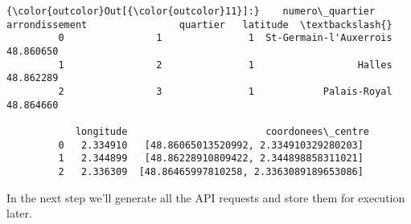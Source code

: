 \documentclass[11pt]{article}
\begin{document}
\begin{Verbatim}[commandchars=\\\{\}]
{\color{outcolor}Out[{\color{outcolor}11}]:}    numero\_quartier  arrondissement                quartier   latitude  \textbackslash{}
         0                1               1  St-Germain-l'Auxerrois  48.860650   
         1                2               1                  Halles  48.862289   
         2                3               1            Palais-Royal  48.864660   
         
            longitude                        coordonees\_centre  
         0   2.334910   [48.86065013520992, 2.334910329280203]  
         1   2.344899   [48.86228910809422, 2.344898858311021]  
         2   2.336309  [48.86465997810258, 2.3363089189653086]  
\end{Verbatim}
            
    In the next step we'll generate all the API requests and store them for
execution later.
\end{document}

